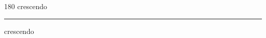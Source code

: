 
\begin{frame}
\begin{center}
\begin{turn}{180}
{\fontsize{2.5cm}{1em}\selectfont crescendo}
\end{turn}
\vspace{1em}\par  
\hrule
\vspace{1em}\par  
{\fontsize{2.5cm}{1em}\selectfont crescendo}
\end{center}
\end{frame}
